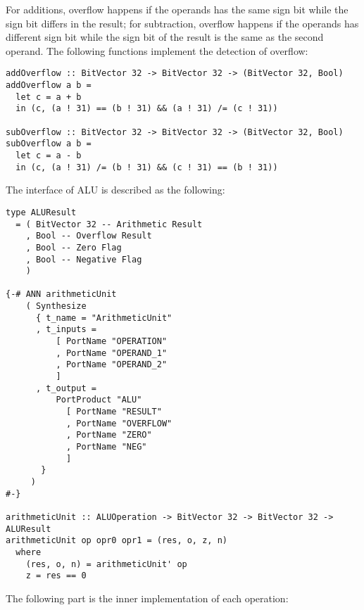 For additions, overflow happens if the operands has the same sign bit while the sign bit differs in the result; for subtraction, overflow happens if the operands has different sign bit while the sign bit of the result is the same as the second operand. The following functions implement the detection of overflow:
\begin{verbatim}
addOverflow :: BitVector 32 -> BitVector 32 -> (BitVector 32, Bool)
addOverflow a b =
  let c = a + b
  in (c, (a ! 31) == (b ! 31) && (a ! 31) /= (c ! 31))

subOverflow :: BitVector 32 -> BitVector 32 -> (BitVector 32, Bool)
subOverflow a b =
  let c = a - b
  in (c, (a ! 31) /= (b ! 31) && (c ! 31) == (b ! 31))
\end{verbatim}

The interface of ALU is described as the following:
\begin{verbatim}
type ALUResult
  = ( BitVector 32 -- Arithmetic Result
    , Bool -- Overflow Result
    , Bool -- Zero Flag
    , Bool -- Negative Flag
    )

{-# ANN arithmeticUnit
    ( Synthesize
      { t_name = "ArithmeticUnit"
      , t_inputs =
          [ PortName "OPERATION"
          , PortName "OPERAND_1"
          , PortName "OPERAND_2"
          ]
      , t_output =
          PortProduct "ALU"
            [ PortName "RESULT"
            , PortName "OVERFLOW"
            , PortName "ZERO"
            , PortName "NEG"
            ]
       }
     )
#-}

arithmeticUnit :: ALUOperation -> BitVector 32 -> BitVector 32 -> ALUResult
arithmeticUnit op opr0 opr1 = (res, o, z, n)
  where
    (res, o, n) = arithmeticUnit' op
    z = res == 0
\end{verbatim}
The following part is the inner implementation of each operation:
